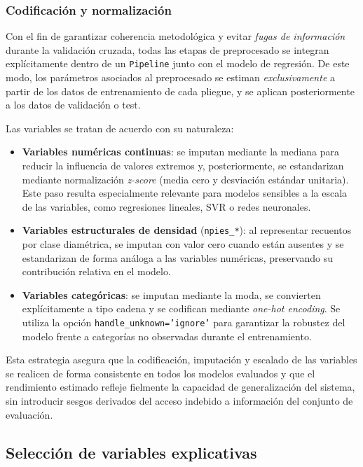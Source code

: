 \subsubsection{Codificación y normalización}

Con el fin de garantizar coherencia metodológica y evitar \emph{fugas de información} durante la validación cruzada, todas las etapas de preprocesado se integran explícitamente dentro de un \texttt{Pipeline} junto con el modelo de regresión. De este modo, los parámetros asociados al preprocesado se estiman \emph{exclusivamente} a partir de los datos de entrenamiento de cada pliegue, y se aplican posteriormente a los datos de validación o test.

Las variables se tratan de acuerdo con su naturaleza:

\begin{itemize}
    \item \textbf{Variables numéricas continuas}: se imputan mediante la mediana para reducir la influencia de valores extremos y, posteriormente, se estandarizan mediante normalización \emph{z-score} (media cero y desviación estándar unitaria). Este paso resulta especialmente relevante para modelos sensibles a la escala de las variables, como regresiones lineales, SVR o redes neuronales.

    \item \textbf{Variables estructurales de densidad} (\texttt{npies\_*}): al representar recuentos por clase diamétrica, se imputan con valor cero cuando están ausentes y se estandarizan de forma análoga a las variables numéricas, preservando su contribución relativa en el modelo.

    \item \textbf{Variables categóricas}: se imputan mediante la moda, se convierten explícitamente a tipo cadena y se codifican mediante \textit{one-hot encoding}. Se utiliza la opción \texttt{handle\_unknown='ignore'} para garantizar la robustez del modelo frente a categorías no observadas durante el entrenamiento.
\end{itemize}

Esta estrategia asegura que la codificación, imputación y escalado de las variables se realicen de forma consistente en todos los modelos evaluados y que el rendimiento estimado refleje fielmente la capacidad de generalización del sistema, sin introducir sesgos derivados del acceso indebido a información del conjunto de evaluación.

\subsection{Selección de variables explicativas}

